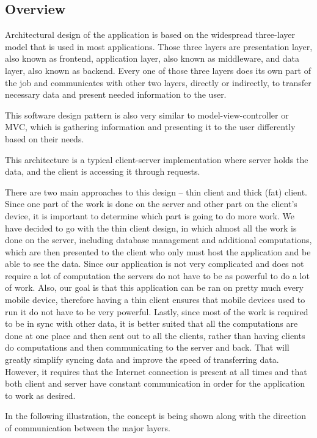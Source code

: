 
\subsection{Overview}
\label{sec:overview}
Architectural design of the application is based on the widespread three-layer model that is used in most applications. Those three layers are presentation layer, also known as frontend, application layer, also known as middleware, and data layer, also known as backend. Every one of those three layers does its own part of the job and communicates with other two layers, directly or indirectly, to transfer necessary data and present needed information to the user. 

This software design pattern is also very similar to model-view-controller or MVC, which is gathering information and presenting it to the user differently based on their needs. 

This architecture is a typical client-server implementation where server holds the data, and the client is accessing it through requests. 

There are two main approaches to this design – thin client and thick (fat) client. Since one part of the work is done on the server and other part on the client’s device, it is important to determine which part is going to do more work. We have decided to go with the thin client design, in which almost all the work is done on the server, including database management and additional computations, which are then presented to the client who only must host the application and be able to see the data. Since our application is not very complicated and does not require a lot of computation the servers do not have to be as powerful to do a lot of work. Also, our goal is that this application can be ran on pretty much every mobile device, therefore having a thin client ensures that mobile devices used to run it do not have to be very powerful. Lastly, since most of the work is required to be in sync with other data, it is better suited that all the computations are done at one place and then sent out to all the clients, rather than having clients do computations and then communicating to the server and back. That will greatly simplify syncing data and improve the speed of transferring data. However, it requires that the Internet connection is present at all times and that both client and server have constant communication in order for the application to work as desired.  

In the following illustration, the concept is being shown along with the direction of communication between the major layers.\newline 

